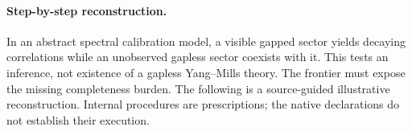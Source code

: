%
%
%
\paragraph{Step-by-step reconstruction.}
In an abstract spectral calibration model, a visible gapped sector yields decaying correlations while an unobserved gapless sector coexists with it. This tests an inference, not existence of a gapless Yang--Mills theory. The frontier must expose the missing completeness burden.
The following is a source-guided illustrative reconstruction. Internal procedures are prescriptions; the native declarations do not establish their execution.
